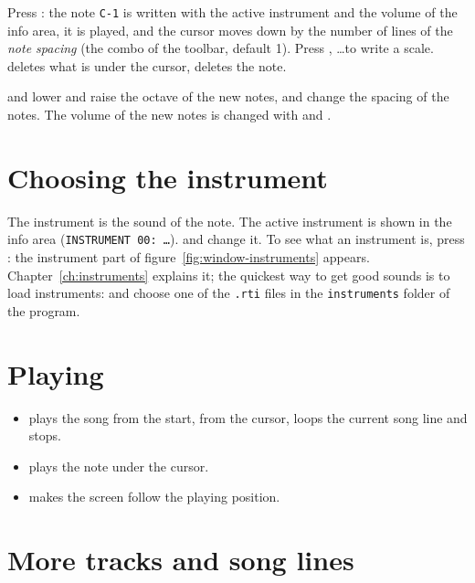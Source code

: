 Press : the note \texttt{C-1} is written with the active instrument and the volume of the info area, it is played, and
the cursor moves down by the number of lines of the \emph{note spacing} (the combo of the toolbar, default 1). Press
, \ldots to write a scale.  deletes what is under the cursor,  deletes the note.

\begin{tip}
 and  lower and raise the octave of the new notes,  and 
change the spacing of the notes. The volume of the new notes is changed with  and
.
\end{tip}

\section{Choosing the instrument}

The instrument is the sound of the note. The active instrument is shown in the info area (\texttt{INSTRUMENT 00: \ldots}).
 and  change it. To see what an instrument is, press : the instrument part of figure~\ref{fig:window-instruments} appears. Chapter~\ref{ch:instruments}
explains it; the quickest way to get good sounds is to load instruments: 
and choose one of the \texttt{.rti} files in the \texttt{instruments} folder of the program.

\section{Playing}

\begin{itemize}
  \item {} plays the song from the start,  from the cursor,  loops the current song line and
         stops.
  \item {} plays the note under the cursor.
  \item {} makes the screen follow the playing position.
\end{itemize}

\section{More tracks and song lines}

